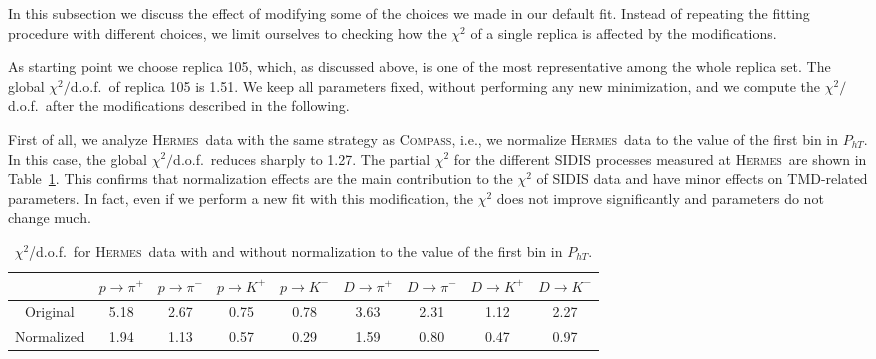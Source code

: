 \documentclass[aps,preprintnumbers,showpacs,nofootinbib,superscriptaddress,floatfix]{revtex4}
\newcommand{\hermes}{\textsc{Hermes}}
\newcommand{\compass}{\textsc{Compass}}
\begin{document}
In this subsection we discuss the effect of modifying some of the choices we
made in our default fit. Instead of repeating the fitting procedure with
different choices, we limit ourselves to checking how the $\chi^2$ of a single
replica is affected by the modifications. 

As starting point we choose replica
105, which, as discussed above, is one of the most representative among the
whole replica set. 
The global $\chi^2/$d.o.f.\ of replica 105 is 1.51. We keep all parameters
fixed, without performing any new minimization, 
and we compute the $\chi^2/$d.o.f.\ after the modifications described in the
following.

First of all, we analyze \hermes\ data with the same strategy as \compass,
i.e., we normalize \hermes\ data to the value of the first bin
in $P_{hT}$. In this case, the global
$\chi^2/$d.o.f.\ reduces sharply to 1.27. The partial $\chi^2$ for the
different SIDIS processes measured 
at \hermes\ are shown in Table~\ref{t:replica105-hermes}. 
This confirms that normalization effects are the main contribution to the
$\chi^2$ of SIDIS data and have minor effects on TMD-related parameters. In
fact, even if we perform a new fit with this modification, the $\chi^2$ does
not improve significantly and parameters do not change much.


\begin{table}[h!]
\begin{center}
\begin{tabular}{|c|c|c|c|c|c|c|c|c|}
 \hline
\hline
 ~     &  $p \to \pi^+$    &   $p \to \pi^-$    &  $p \to K^+$    &   $p \to K^-$       &  $D \to \pi^+$    &   $D \to \pi^-$    &  $D \to K^+$    &   $D \to K^-$                \\
\hline
 Original   &  5.18 &  2.67 & 0.75  & 0.78      &  3.63 &  2.31 & 1.12  & 2.27    \\
 \hline
Normalized  &  1.94 &  1.13 &  0.57 & 0.29 & 1.59  & 0.80 & 0.47 & 0.97  \\            
 \hline
 \hline
\end{tabular}
\caption{$\chi^2$/d.o.f.\ for \hermes\ data with and without normalization to the value of the first bin in $P_{hT}$.} 
\label{t:replica105-hermes}
\end{center}
\end{table}
\end{document}
